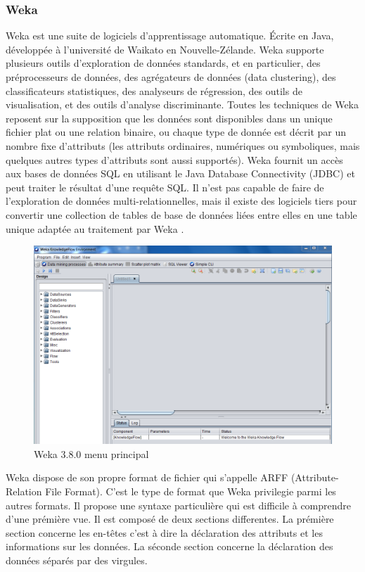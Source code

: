 \documentclass[11pt,a4paper]{report}
\begin{document}
\subsubsection{Weka}
Weka est une suite de logiciels d'apprentissage automatique. Écrite en Java, développée à l'université de Waikato en Nouvelle-Zélande.
Weka supporte plusieurs outils d'exploration de données standards, et en particulier, des préprocesseurs de données, des agrégateurs de données (data clustering), des classificateurs statistiques, des analyseurs de régression, des outils de visualisation, et des outils d'analyse discriminante. Toutes les techniques de Weka reposent sur la supposition que les données sont disponibles dans un unique fichier plat ou une relation binaire, ou chaque type de donnée est décrit par un nombre fixe d'attributs (les attributs ordinaires, numériques ou symboliques, mais quelques autres types d'attributs sont aussi supportés). Weka fournit un accès aux bases de données SQL en utilisant le Java Database Connectivity (JDBC) et peut traiter le résultat d'une requête SQL. Il n'est pas capable de faire de l'exploration de données multi-relationnelles, mais il existe des logiciels tiers pour convertir une collection de tables de base de données liées entre elles en une table unique adaptée au traitement par Weka \cite{weka}.
  \newpage
  \begin{figure}[h]
   \centering
   \includegraphics[scale=0.20]{weka.PNG}
     \caption{Weka 3.8.0 menu principal}
\end{figure}

Weka dispose de son propre format de fichier qui s'appelle ARFF (Attribute-Relation File Format). C'est le type de format que Weka privilegie parmi les autres formats. Il propose une syntaxe particulière qui est difficile à comprendre d'une prémière vue. Il est composé de deux sections differentes. La prémière section concerne les en-têtes c'est à dire la déclaration des attributs et les informations sur les données. La séconde section concerne la déclaration des données séparés par des virgules.\\\\ 
\end{document}

